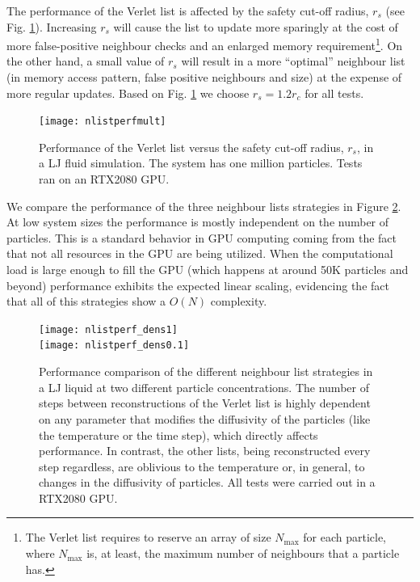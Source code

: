 \documentclass[twoside,openright,titlepage,numbers=noenddot,%
headinclude,footinclude,cleardoublepage=empty,abstract=on,
BCOR=5mm,fontsize=11pt, dvipsnames, paper=b5
]{scrreprt}
\begin{document}
The performance of the Verlet list is affected by the safety cut-off radius, $r_s$ (see Fig. \ref{fig:verletlistsafety}). Increasing $r_s$ will cause the list to update more sparingly at the cost of more false-positive neighbour checks and an enlarged memory requirement\footnote{The Verlet list requires to reserve an array of size $N_{\text{max}}$ for each particle, where $N_{\text{max}}$ is, at least, the maximum number of neighbours that a particle has.}. On the other hand, a small value of $r_s$ will result in a more ``optimal'' neighbour list (in memory access pattern, false positive neighbours and size) at the expense of more regular updates. Based on Fig. \ref{fig:verletlistsafety} we choose $r_s = 1.2r_c$ for all tests.
\begin{figure}
  \centering
  \texttt{[image: nlistperfmult]}
  \caption[ ]{Performance of the Verlet list versus the safety cut-off radius, $r_s$, in a \gls{LJ} fluid simulation. The system has one million particles. Tests ran on an RTX2080 GPU.}
  \label{fig:verletlistsafety}
\end{figure}
We compare the performance of the three neighbour lists strategies in Figure \ref{fig:nlistcomp}. At low system sizes the performance is mostly independent on the number of particles. This is a standard behavior in GPU computing coming from the fact that not all resources in the GPU are being utilized. When the computational load is large enough to fill the GPU (which happens at around 50K particles and beyond) performance exhibits the expected linear scaling, evidencing the fact that all of this strategies show a $O(N)$ complexity. 
\begin{figure}
  \centering
  \texttt{[image: nlistperf\_dens1]}\\
  \texttt{[image: nlistperf\_dens0.1]}
  \caption[ ]{Performance comparison of the different neighbour list strategies in a LJ liquid at two different particle concentrations. The number of steps between reconstructions of the Verlet list is highly dependent on any parameter that modifies the diffusivity of the particles (like the temperature or the time step), which directly affects performance. In contrast, the other lists, being reconstructed every step regardless, are oblivious to the temperature or, in general, to changes in the diffusivity of particles. All tests were carried out in a RTX2080 GPU.}
  \label{fig:nlistcomp}
\end{figure}
\end{document}
